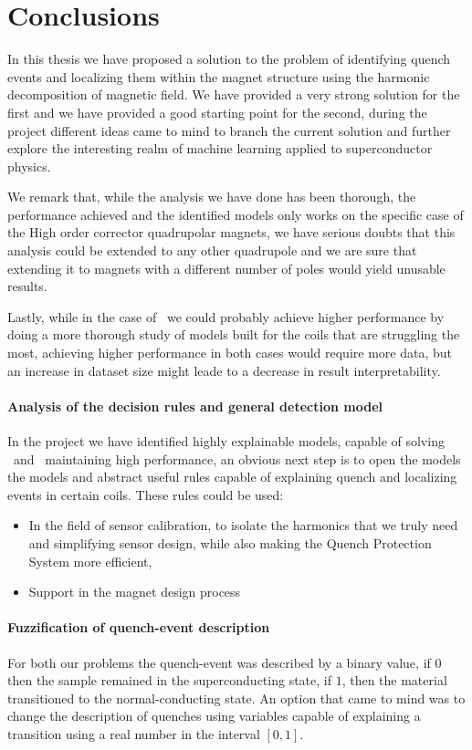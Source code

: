 \chapter{Conclusions}
\label{chp:conclusion}
In this thesis we have proposed a solution to the problem of identifying quench events and
localizing them within the magnet structure using the harmonic decomposition of magnetic field. We
have provided a very strong solution for the first and we have provided a good starting point for
the second, during the project different ideas came to mind to branch the current solution and
further explore the interesting realm of machine learning applied to superconductor physics.

We remark that, while the analysis we have done has been thorough, the performance achieved and the
identified models only works on the specific case of the High order corrector quadrupolar magnets,
we have serious doubts that this analysis could be extended to any other quadrupole and we are sure
that extending it to magnets with a different number of poles would yield unusable results.

Lastly, while in the case of \qlp\ we could probably achieve higher performance by doing a more
thorough study of models built for the coils that are struggling the most, achieving higher
performance in both cases would require more data, but an increase in dataset size might leade to a
decrease in result interpretability.

\subsubsection{Analysis of the decision rules and general detection model}
In the project we have identified highly explainable models, capable of solving \qrp\ and \qlp\
maintaining high performance, an obvious next step is to open the models the models and abstract
useful rules capable of explaining quench and localizing events in certain coils. These rules could
be used:
\begin{itemize}
	\item In the field of sensor calibration, to isolate the harmonics that we truly need and
	      simplifying sensor design, while also making the Quench Protection System more efficient,
	\item Support in the magnet design process
\end{itemize}

\subsubsection{Fuzzification of quench-event description}
For both our problems the quench-event was described by a binary value, if $0$ then the sample
remained in the superconducting state, if $1$, then the material transitioned to the normal-conducting state. An option that came to mind was to change the description of quenches using variables capable of explaining a transition using a real number in the interval $[0, 1]$.


